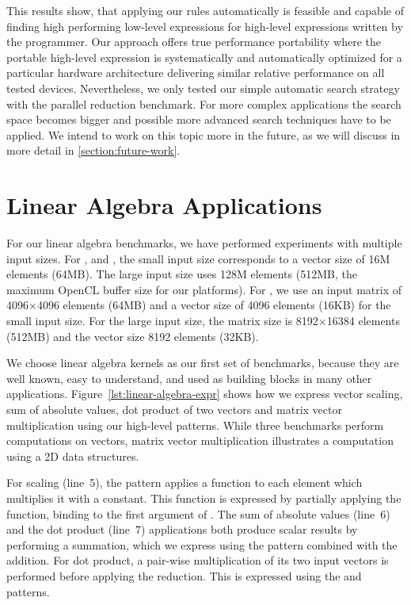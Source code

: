 \bigskip

\noindent
This results show, that applying our rules automatically is feasible and capable of finding high performing low-level expressions for high-level expressions written by the programmer.
Our approach offers true performance portability where the portable high-level expression is systematically and automatically optimized for a particular hardware architecture delivering similar relative performance on all tested devices.
Nevertheless, we only tested our simple automatic search strategy with the parallel reduction benchmark.
For more complex applications the search space becomes bigger and possible more advanced search techniques have to be applied.
We intend to work on this topic more in the future, as we will discuss in more detail in \autoref{section:future-work}.


\section{Linear Algebra Applications}

For our linear algebra benchmarks, we have performed experiments with multiple input sizes.
For ,  and , the small input size corresponds to a vector size of 16M elements (64MB).
The large input size uses 128M elements (512MB, the maximum OpenCL buffer size for our platforms).
For , we use an input matrix of 4096$\times$4096 elements (64MB) and a vector size of 4096 elements (16KB) for the small input size.
For the large input size, the matrix size is 8192$\times$16384 elements (512MB) and the vector size 8192 elements (32KB).


We choose linear algebra kernels as our first set of benchmarks, because they are well known, easy to understand, and used as building blocks in many other applications.
Figure~\ref{lst:linear-algebra-expr} shows how we express vector scaling, sum of absolute values, dot product of two vectors and matrix vector multiplication using our high-level patterns.
While three benchmarks perform computations on vectors, matrix vector multiplication illustrates a computation using a 2D data structures.

For scaling (line~5), the  pattern applies a function to each element which multiplies it with a constant.
This function is expressed by partially applying the  function, \ie binding  to the first argument of .
The sum of absolute values (line~6) and the dot product (line~7) applications both produce scalar results by performing a summation, which we express using the  pattern combined with the addition.
For dot product, a pair-wise multiplication of its two input vectors is performed before applying the reduction.
This is expressed using the  and  patterns.

